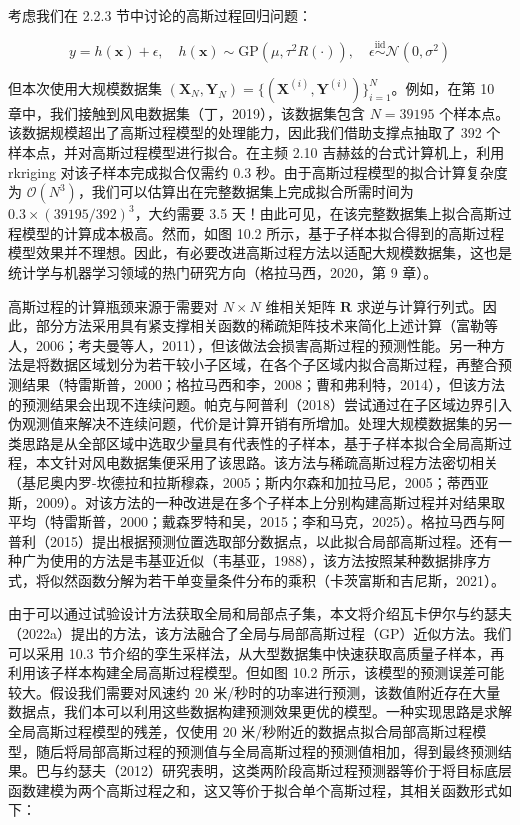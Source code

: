 \documentclass{ctexart}
\begin{document}
考虑我们在 2.2.3 节中讨论的高斯过程回归问题：

\begin{equation*}
y=h(\boldsymbol{x})+\epsilon,\quad h(\boldsymbol{x})\sim\mathrm{GP}(\mu,\tau^2R(\cdot)),\quad\epsilon\stackrel{\mathrm{iid}}{\sim}\mathcal{N}(0,\sigma^2)
\end{equation*}

但本次使用大规模数据集 $(\boldsymbol{X}_N,\boldsymbol{Y}_N)=\{(\boldsymbol{X}^{(i)},\boldsymbol{Y}^{(i)})\}_{i=1}^N$。例如，在第 10 章中，我们接触到风电数据集（丁，2019），该数据集包含 $N=39195$ 个样本点。该数据规模超出了高斯过程模型的处理能力，因此我们借助支撑点抽取了 392 个样本点，并对高斯过程模型进行拟合。在主频 2.10 吉赫兹的台式计算机上，利用 rkriging 对该子样本完成拟合仅需约 0.3 秒。由于高斯过程模型的拟合计算复杂度为 $\mathcal{O}(N^3)$，我们可以估算出在完整数据集上完成拟合所需时间为 $0.3\times(39195/392)^3$，大约需要 3.5 天！由此可见，在该完整数据集上拟合高斯过程模型的计算成本极高。然而，如图 10.2 所示，基于子样本拟合得到的高斯过程模型效果并不理想。因此，有必要改进高斯过程方法以适配大规模数据集，这也是统计学与机器学习领域的热门研究方向（格拉马西，2020，第 9 章）。

高斯过程的计算瓶颈来源于需要对 $N\times N$ 维相关矩阵 $\boldsymbol{R}$ 求逆与计算行列式。因此，部分方法采用具有紧支撑相关函数的稀疏矩阵技术来简化上述计算（富勒等人，2006；考夫曼等人，2011），但该做法会损害高斯过程的预测性能。另一种方法是将数据区域划分为若干较小子区域，在各个子区域内拟合高斯过程，再整合预测结果（特雷斯普，2000；格拉马西和李，2008；曹和弗利特，2014），但该方法的预测结果会出现不连续问题。帕克与阿普利（2018）尝试通过在子区域边界引入伪观测值来解决不连续问题，代价是计算开销有所增加。处理大规模数据集的另一类思路是从全部区域中选取少量具有代表性的子样本，基于子样本拟合全局高斯过程，本文针对风电数据集便采用了该思路。该方法与稀疏高斯过程方法密切相关（基尼奥内罗-坎德拉和拉斯穆森，2005；斯内尔森和加拉马尼，2005；蒂西亚斯，2009）。对该方法的一种改进是在多个子样本上分别构建高斯过程并对结果取平均（特雷斯普，2000；戴森罗特和吴，2015；李和马克，2025）。格拉马西与阿普利（2015）提出根据预测位置选取部分数据点，以此拟合局部高斯过程。还有一种广为使用的方法是韦基亚近似（韦基亚，1988），该方法按照某种数据排序方式，将似然函数分解为若干单变量条件分布的乘积（卡茨富斯和吉尼斯，2021）。

由于可以通过试验设计方法获取全局和局部点子集，本文将介绍瓦卡伊尔与约瑟夫（2022a）提出的方法，该方法融合了全局与局部高斯过程（GP）近似方法。我们可以采用 10.3 节介绍的孪生采样法，从大型数据集中快速获取高质量子样本，再利用该子样本构建全局高斯过程模型。但如图 10.2 所示，该模型的预测误差可能较大。假设我们需要对风速约 20 米/秒时的功率进行预测，该数值附近存在大量数据点，我们本可以利用这些数据构建预测效果更优的模型。一种实现思路是求解全局高斯过程模型的残差，仅使用 20 米/秒附近的数据点拟合局部高斯过程模型，随后将局部高斯过程的预测值与全局高斯过程的预测值相加，得到最终预测结果。巴与约瑟夫（2012）研究表明，这类两阶段高斯过程预测器等价于将目标底层函数建模为两个高斯过程之和，这又等价于拟合单个高斯过程，其相关函数形式如下：
\end{document}
